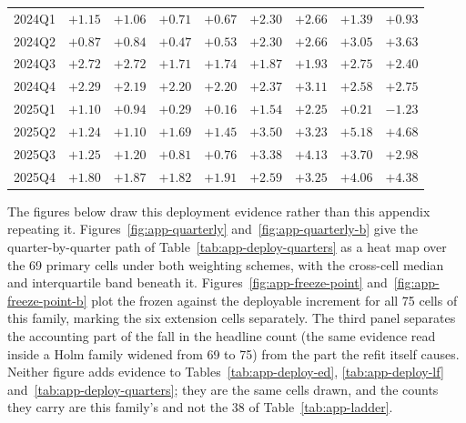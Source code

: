 \begin{table}[htbp]
\begin{tabular}{@{}lrrrrrrrr@{}}
2024Q1 & $+1.15$ & $+1.06$ & $+0.71$ & $+0.67$ & $+2.30$ & $+2.66$ & $+1.39$ & $+0.93$ \\
2024Q2 & $+0.87$ & $+0.84$ & $+0.47$ & $+0.53$ & $+2.30$ & $+2.66$ & $+3.05$ & $+3.63$ \\
2024Q3 & $+2.72$ & $+2.72$ & $+1.71$ & $+1.74$ & $+1.87$ & $+1.93$ & $+2.75$ & $+2.40$ \\
2024Q4 & $+2.29$ & $+2.19$ & $+2.20$ & $+2.20$ & $+2.37$ & $+3.11$ & $+2.58$ & $+2.75$ \\
2025Q1 & $+1.10$ & $+0.94$ & $+0.29$ & $+0.16$ & $+1.54$ & $+2.25$ & $+0.21$ & $-1.23$ \\
2025Q2 & $+1.24$ & $+1.10$ & $+1.69$ & $+1.45$ & $+3.50$ & $+3.23$ & $+5.18$ & $+4.68$ \\
2025Q3 & $+1.25$ & $+1.20$ & $+0.81$ & $+0.76$ & $+3.38$ & $+4.13$ & $+3.70$ & $+2.98$ \\
2025Q4 & $+1.80$ & $+1.87$ & $+1.82$ & $+1.91$ & $+2.59$ & $+3.25$ & $+4.06$ & $+4.38$ \\
\bottomrule
\end{tabular}
\end{table}

The figures below draw this deployment evidence rather than
this appendix repeating it. Figures~\ref{fig:app-quarterly} and~\ref{fig:app-quarterly-b} give the
quarter-by-quarter path of Table~\ref{tab:app-deploy-quarters} as a heat map
over the 69 primary cells under both weighting schemes, with the cross-cell
median and interquartile band beneath it. Figures~\ref{fig:app-freeze-point} and~\ref{fig:app-freeze-point-b}
plot the frozen against the deployable increment for all 75 cells of this
family, marking the six extension cells separately. The third panel
separates the accounting part of the fall in the headline count (the same
evidence read inside a Holm family widened from 69 to 75) from the part the
refit itself causes. Neither figure adds evidence to
Tables~\ref{tab:app-deploy-ed}, \ref{tab:app-deploy-lf}
and~\ref{tab:app-deploy-quarters}; they are the same cells drawn, and the
counts they carry are this family's and not the 38 of
Table~\ref{tab:app-ladder}.

\clearpage

